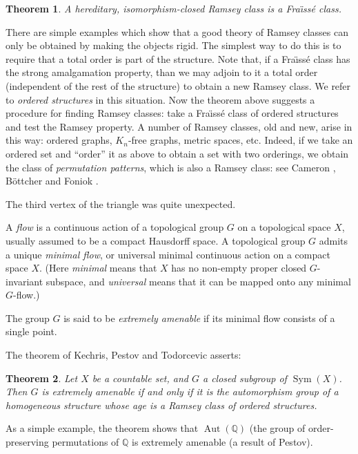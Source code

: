 \documentclass[12pt]{article}
\newtheorem{theorem}{Theorem}
\DeclareMathOperator{\Sym}{Sym}
\DeclareMathOperator{\Aut}{Aut}
\begin{document}
\begin{theorem}
A hereditary, isomorphism-closed Ramsey class is a Fra\"{\i}ss\'e class.
\end{theorem}

There are simple examples which show that a good theory of Ramsey classes
can only be obtained by making the objects rigid. The simplest way to do this
is to require that a total order is part of the structure. Note that, if a
Fra\"{\i}ss\'e class has the strong amalgamation property, than we may adjoin
to it a total order (independent of the rest of the structure) to obtain a
new Ramsey class. We refer to \emph{ordered structures} in this situation.
Now the theorem above suggests a procedure for finding Ramsey classes: take
a Fra\"{\i}ss\'e class of ordered structures and test the Ramsey property.
A number of Ramsey classes, old and new, arise in this way: ordered graphs,
$K_n$-free graphs, metric spaces, etc. Indeed, if we take an ordered set
and ``order'' it as above to obtain a set with two orderings, we obtain
the class of \emph{permutation patterns}, which is also a Ramsey class:
see Cameron \cite{ch32:new2}, B\"ottcher and Foniok \cite{ch32:new4}.

The third vertex of the triangle was quite unexpected. 

A \emph{flow} is a continuous action of a topological group $G$ on a 
topological space $X$, usually assumed to be a compact Hausdorff space.
A topological group $G$ admits a unique \emph{minimal flow}, or universal
minimal continuous action on a compact space $X$. (Here \emph{minimal} means
that $X$ has no non-empty proper closed $G$-invariant subspace, and
\emph{universal} means that it can be mapped onto any minimal $G$-flow.)

The group $G$ is said to be \emph{extremely amenable} if its minimal flow
consists of a single point.

The theorem of Kechris, Pestov and Todorcevic \cite{ch32:new10} asserts:

\begin{theorem}
Let $X$ be a countable set, and $G$ a closed subgroup of $\Sym(X)$. Then
$G$ is extremely amenable if and only if it is the automorphism group of
a homogeneous structure whose age is a Ramsey class of ordered structures.
\end{theorem}

As a simple example, the theorem shows that $\Aut(\mathbb{Q})$ (the group
of order-preserving permutations of $\mathbb{Q}$ is extremely amenable
(a result of Pestov).
\end{document}
